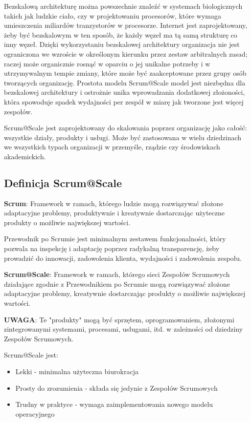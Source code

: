 \documentclass[12pt,a4paper,parskip=full]{scrartcl}
\begin{document}
Bezskalową architekturę można powszechnie znaleźć w systemach biologicznych takich jak ludzkie ciało, czy w projektowaniu procesorów, które wymaga umieszczenia miliardów tranzystorów w procesorze. Internet jest zaprojektowany, żeby być bezskalowym w ten sposób, że każdy węzeł ma tą samą strukturę co inny węzeł. Dzięki wykorzystaniu bezskalowej architektury organizacja nie jest ograniczona we wzroście w określonym kierunku przez zestaw arbitralnych zasad; raczej może organicznie rosnąć w oparciu o jej unikalne potrzeby i w utrzymywalnym tempie zmiany, które może być zaakceptowane przez grupy osób tworzących organizację. Prostota modelu Scrum@Scale model jest niezbędna dla  bezskalowej architektury i ostrożnie unika wprowadzania dodatkowej złożoności, która spowoduje spadek wydajności per zespół w miarę jak tworzone jest więcej zespołów.

Scrum@Scale jest zaprojektowany do skalowania poprzez organizację jako całość: wszystkie działy, produkty i usługi. Może być zastosowana w wielu dziedzinach we wszystkich typach organizacji w przemyśle, rządzie czy środowiskach akademickich.

\subsection{Definicja Scrum@Scale}

\textbf{Scrum}: Framework w ramach, którego ludzie mogą rozwiązywać złożone adaptacyjne problemy, produktywnie i kreatywnie dostarczając użyteczne produkty o możliwie największej wartości.

Przewodnik po Scrumie jest minimalnym zestawem funkcjonalności, który pozwala na inspekcję i adaptację poprzez radykalną transparencję, żeby prowadzić do innowacji, zadowolenia klienta, wydajności i zadowolenia zespołu.

\textbf{Scrum@Scale}: Framework w ramach, którego sieci Zespołów Scrumowych działające zgodnie z Przewodnikiem po Scrumie mogą rozwiązywać złożone adaptacyjne problemy, kreatywnie dostarczając  produkty o możliwie największej wartości.

\textbf{UWAGA}: Te "produkty" mogą być sprzętem, oprogramowaniem, złożonymi zintegrowanymi systemami, procesami, usługami, itd. w zależności od dziedziny Zespołów Scrumowych.

Scrum@Scale jest:
\begin{itemize}
	\item Lekki - minimalna użyteczna biurokracja
	\item Prosty do zrozumienia - składa się jedynie z Zespołów Scrumowych
	\item Trudny w praktyce - wymaga zaimplementowania nowego modelu operacyjnego
\end{itemize}
\end{document}
